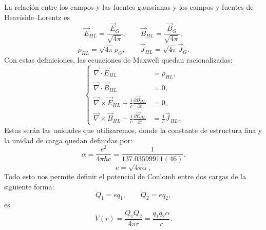 \documentclass[a4paper,11pt]{book} %
\begin{document}
La relación entre los campos y las fuentes gaussianas y los campos y fuentes
de Heaviside--Lorentz es
\begin{equation}
    \vec{E}_{HL} = \frac{\vec{E}_G}{\sqrt{4\pi}},
    \qquad
    \vec{B}_{HL} = \frac{\vec{B}_G}{\sqrt{4\pi}},
\end{equation}
\begin{equation}
    \rho_{HL} = \sqrt{4\pi}\rho_G,
    \qquad
    \vec{J}_{HL} = \sqrt{4\pi}\vec{J}_G.
\end{equation}
Con estas definiciones, las ecuaciones de Maxwell quedan racionalizadas:
\begin{equation}
\left\{
\begin{aligned}
    \vec{\nabla}\cdot \vec{E}_{HL} &= \rho_{HL}, \\
    \vec{\nabla}\cdot \vec{B}_{HL} &= 0, \\
    \vec{\nabla}\times \vec{E}_{HL}
    + \frac{1}{c}\frac{\partial \vec{B}_{HL}}{\partial t}
    &= 0, \\
    \vec{\nabla}\times \vec{B}_{HL}
    - \frac{1}{c}\frac{\partial \vec{E}_{HL}}{\partial t}
    &= \frac{1}{c}\vec{J}_{HL}.
\end{aligned}
\right.
\end{equation}
Estas serán las unidades que utilizaremos, donde la constante de estructura fina y la unidad de carga quedan definidas por:
\begin{equation}
    \alpha
    =
    \frac{e^2}{4\pi \hbar c}
    =
    \frac{1}{137.03599911(46)}.
\end{equation}
\begin{equation}
    e = \sqrt{4\pi \alpha},
\end{equation}
\noindent
Todo esto nos permite definir el potencial de Coulomb entre dos cargas de la siguiente forma:
\begin{equation}
    Q_1 = e q_1,
    \qquad
    Q_2 = e q_2,
\end{equation}
es
\begin{equation}
    V(r)
    =
    \frac{Q_1 Q_2}{4\pi r}
    =
    \frac{q_1 q_2 \alpha}{r}.
\end{equation}
\end{document}
